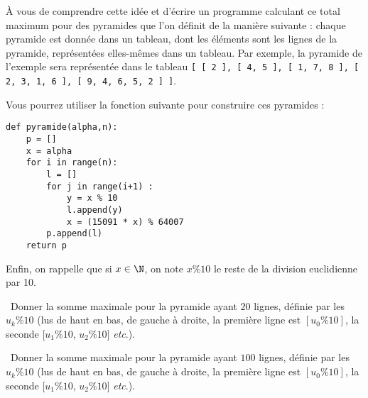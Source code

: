 À vous de comprendre cette idée et d'écrire un programme calculant ce total maximum pour 
des pyramides que l'on définit de la manière suivante : chaque pyramide est donnée dans 
un tableau, dont les éléments sont les lignes de la pyramide, représentées elles-mêmes 
dans un tableau. Par exemple, la pyramide de l'exemple sera représentée dans le tableau 
\texttt{[ [ 2 ], [ 4, 5 ], [ 1, 7, 8 ], [ 2, 3, 1, 6 ], [ 9, 4, 6, 5, 2 ] ]}. 

Vous pourrez utiliser la fonction suivante pour construire ces pyramides :
\begin{lstlisting}
def pyramide(alpha,n):
    p = []
    x = alpha
    for i in range(n):
        l = []
        for j in range(i+1) :
            y = x % 10
            l.append(y)
            x = (15091 * x) % 64007
        p.append(l)
    return p
\end{lstlisting}

Enfin, on rappelle que si $x\in\N$, on note $x\% 10$ le reste de la division euclidienne par 10.

\question\ Donner la somme maximale pour la pyramide ayant $20$ lignes, définie par les $u_k \% 10$ (lus de haut en bas, de gauche à droite, la première ligne est $[u_0\%10]$, la seconde $[u_1\%10$, $u_2\%10]$ \emph{etc}.).

\medskip

\question\ Donner la somme maximale pour la pyramide ayant $100$ lignes, définie par les $u_k \% 10$ (lus de haut en bas, de gauche à droite, la première ligne est $[u_0\%10]$, la seconde $[u_1\%10$, $u_2\%10]$ \emph{etc}.).